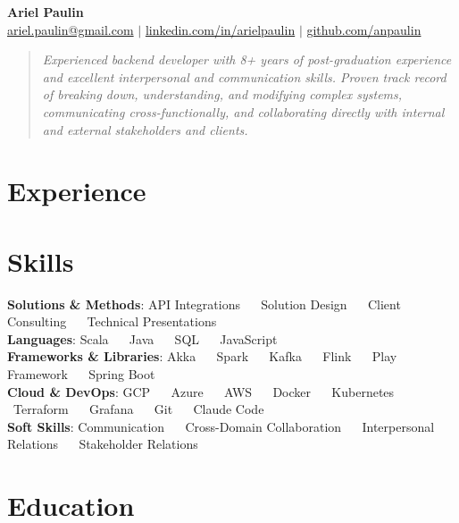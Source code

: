 \documentclass[letterpaper,11pt]{article}
\newcommand{\resumeSubHeadingListStart}{\begin{itemize}[leftmargin=0.15in, label={}]}
\newcommand{\resumeSubHeadingListEnd}{\end{itemize}}
\begin{document}
\begin{center}
    \textbf{\Huge Ariel Paulin} \\ \vspace{2pt}
    \small{
    \href{mailto:ariel.paulin@gmail.com}{ariel.paulin@gmail.com} $|$ 
    \href{https://www.linkedin.com/in/arielpaulin}{linkedin.com/in/arielpaulin} $|$
    \href{https://github.com/anpaulin}{github.com/anpaulin}
    }
    \vspace{2pt}
\end{center}
\begin{quote}
    \vspace{2pt}
    \small\textit{Experienced backend developer with 8+ years of post-graduation experience and excellent interpersonal and communication skills. Proven track record of breaking down, understanding, and modifying complex systems, communicating cross-functionally, and collaborating directly with internal and external stakeholders and clients.}
    \vspace{-5pt}
\end{quote}

\section{Experience}
  \resumeSubHeadingListStart
    
    
    
    
    
  \resumeSubHeadingListEnd

\section{Skills}
\begin{itemize}[leftmargin=0.15in, label={}]
  \small{\item{
    \textbf{Solutions \& Methods}: \quad API Integrations \ \textbf{\textbar} \ Solution Design \ \textbf{\textbar} \ Client Consulting \ \textbf{\textbar} \ Technical Presentations \\
    \textbf{Languages}: \quad Scala \ \textbf{\textbar} \ Java \ \textbf{\textbar} \ SQL \ \textbf{\textbar} \ JavaScript \\
    \textbf{Frameworks \& Libraries}: \quad Akka \ \textbf{\textbar} \ Spark \ \textbf{\textbar} \ Kafka \ \textbf{\textbar} \ Flink \ \textbf{\textbar} \ Play Framework \ \textbf{\textbar} \ Spring Boot \\
    \textbf{Cloud \& DevOps}: \quad GCP \ \textbf{\textbar} \ Azure \ \textbf{\textbar} \ AWS \ \textbf{\textbar} \ Docker \ \textbf{\textbar} \ Kubernetes \ \textbf{\textbar} \ Terraform \ \textbf{\textbar} \ Grafana \ \textbf{\textbar} \ Git \ \textbf{\textbar} \ Claude Code \\
    \textbf{Soft Skills}: \quad Communication \ \textbf{\textbar} \ Cross-Domain Collaboration \ \textbf{\textbar} \ Interpersonal Relations \ \textbf{\textbar} \ Stakeholder Relations
  }}
\end{itemize}

\section{Education}
  \resumeSubHeadingListStart
    
  \resumeSubHeadingListEnd


\end{document}
